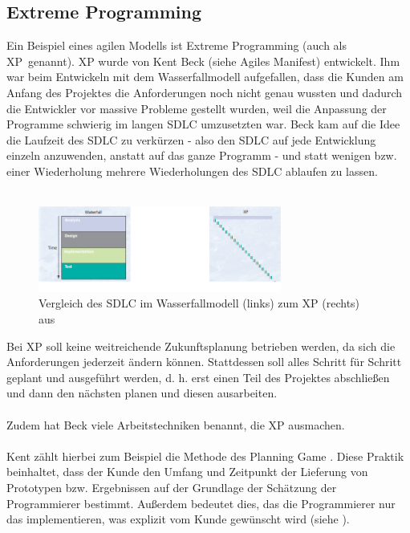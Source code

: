 \documentclass[a4paper, 10pt]{scrartcl}
\begin{document}
\subsection{Extreme Programming}
Ein Beispiel eines agilen Modells ist Extreme Programming (auch als \glqq XP\grqq\ genannt). XP wurde von Kent Beck (siehe \glqq Agiles Manifest\grqq) entwickelt. Ihm war beim Entwickeln mit dem Wasserfallmodell aufgefallen, dass die Kunden am Anfang des Projektes die Anforderungen noch nicht genau wussten und dadurch die Entwickler vor massive Probleme gestellt wurden, weil die Anpassung der Programme schwierig im langen SDLC umzusetzten war. Beck kam auf die Idee die Laufzeit des SDLC zu verkürzen - also den SDLC auf jede Entwicklung einzeln anzuwenden, anstatt auf das ganze Programm - und statt wenigen bzw. einer Wiederholung mehrere Wiederholungen des SDLC ablaufen zu lassen.\\\\
\begin{figure}
\begin{center}
\includegraphics[width=8cm]{xp2.png}
\caption{Vergleich des SDLC im Wasserfallmodell (links) zum XP (rechts) aus \cite{beck1999}}
\end{center}
\end{figure}
Bei XP soll keine weitreichende Zukunftsplanung betrieben werden, da sich die Anforderungen jederzeit ändern können. Stattdessen soll alles Schritt für Schritt geplant und ausgeführt werden, d. h. erst einen Teil des Projektes abschließen und dann den nächsten planen und diesen ausarbeiten.\\\\
Zudem hat Beck viele Arbeitstechniken benannt, die XP ausmachen.\\\\
Kent zählt hierbei zum Beispiel die Methode des \glqq Planning Game\grqq{} \citep{beck1999}. Diese Praktik beinhaltet, dass der Kunde den Umfang und Zeitpunkt der Lieferung von Prototypen bzw. Ergebnissen auf der Grundlage der Schätzung der Programmierer bestimmt. Außerdem bedeutet dies, das die Programmierer nur das implementieren, was explizit vom Kunde gewünscht wird (siehe ).\\\\
\end{document}
